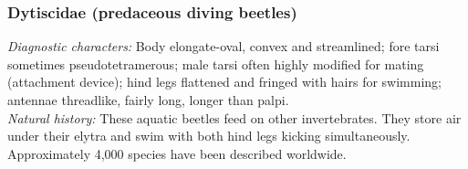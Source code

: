 \documentclass[letterpaper, 11pt]{article}
\begin{document}
\subsubsection{Dytiscidae (predaceous diving beetles)}
\noindent{}\textit{Diagnostic characters:} Body elongate-oval, convex and streamlined; fore tarsi sometimes pseudotetramerous; male tarsi often highly modified for mating (attachment device); hind legs flattened and fringed with hairs for swimming; antennae threadlike, fairly long, longer than palpi.\\

\noindent{}\textit{Natural history:} These aquatic beetles feed on other invertebrates. They store air under their elytra and swim with both hind legs kicking simultaneously. Approximately 4,000 species have been described worldwide.
\end{document}
